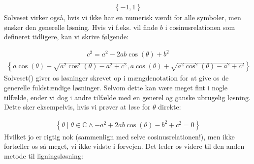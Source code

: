 \documentclass[letterpaper,10pt,english]{jupyterBook}
\begin{document}
\begin{sphinxVerbatim}[commandchars=\\\{\}]
    
\end{sphinxVerbatim}
\begin{equation*}
\begin{split}\displaystyle \left\{-1, 1\right\}\end{split}
\end{equation*}
Solveset virker også, hvis vi ikke har en numerisk værdi for alle symboler, men ønsker den generelle løsning. Hvis vi f.eks. vil finde \(b\) i cosinusrelationen som defineret tidligere, kan vi skrive følgende:

\begin{sphinxVerbatim}[commandchars=\\\{\}]
   
\end{sphinxVerbatim}
\begin{equation*}
\begin{split}\displaystyle c^{2} = a^{2} - 2 a b \cos{\left(\theta \right)} + b^{2}\end{split}
\end{equation*}\begin{equation*}
\begin{split}\displaystyle \left\{a \cos{\left(\theta \right)} - \sqrt{a^{2} \cos^{2}{\left(\theta \right)} - a^{2} + c^{2}}, a \cos{\left(\theta \right)} + \sqrt{a^{2} \cos^{2}{\left(\theta \right)} - a^{2} + c^{2}}\right\}\end{split}
\end{equation*}
Solveset() giver os løsninger skrevet op i mængdenotation for at give os de generelle fuldstændige løsninger. Selvom dette kan være meget fint i nogle tilfælde, ender vi dog i andre tilfælde med en generel og ganske ubrugelig løsning. Dette sker eksempelvis, hvis vi prøver at løse for \(\theta\) direkte:

\begin{sphinxVerbatim}[commandchars=\\\{\}]
 
\end{sphinxVerbatim}
\begin{equation*}
\begin{split}\displaystyle \left\{\theta \mid \theta \in \mathbb{C} \wedge - a^{2} + 2 a b \cos{\left(\theta \right)} - b^{2} + c^{2} = 0 \right\}\end{split}
\end{equation*}
Hvilket jo er rigtig nok (sammenlign med selve cosinusrelationen!), men ikke fortæller os så meget, vi ikke vidste i forvejen. Det leder os videre til den anden metode til ligningsløsning:
\end{document}
